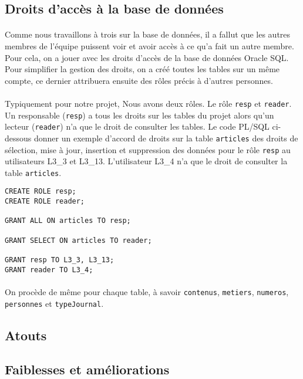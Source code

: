 \subsection{Droits d'accès à la base de données}

\paragraph{}{
    Comme nous travaillons à trois sur la base de données, il a fallut que les autres membres de l'équipe puissent voir et avoir accès à ce qu'a fait un autre membre. Pour cela, on a jouer avec  les droits d'accès de la base de données Oracle SQL. Pour simplifier la gestion des droits, on a créé toutes les tables sur un même compte, ce dernier attribuera ensuite des rôles précis à d'autres personnes.
}
\paragraph{}{
    Typiquement pour notre projet, Nous avons deux rôles. Le rôle \verb|resp| et \verb|reader|. Un responsable (\verb|resp|) a tous les droits sur les tables du projet alors qu'un lecteur (\verb|reader|) n'a que le droit de consulter les tables. Le code PL/SQL ci-dessous donner un exemple d'accord de droits sur la table \verb|articles| des droits de sélection, mise à jour, insertion et suppression des données pour le rôle \verb|resp| au utilisateurs L3\_3 et L3\_13. L'utilisateur L3\_4 n'a que le droit de consulter la table \verb|articles|.
}
\begin{lstlisting}[frame=single]
CREATE ROLE resp;
CREATE ROLE reader;

GRANT ALL ON articles TO resp;

GRANT SELECT ON articles TO reader;

GRANT resp TO L3_3, L3_13;
GRANT reader TO L3_4;
\end{lstlisting}



\paragraph{}{
    On procède de même pour chaque table, à savoir \verb|contenus|, \verb|metiers|, \verb|numeros|, \verb|personnes| et \verb|typeJournal|.
}

\subsection{Atouts}

\subsection{Faiblesses et améliorations}